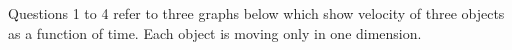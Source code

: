 \documentclass[10pt]{examdesign}
\begin{document}
	\begin{multiplechoice}[title={General Physics}, resetcounter=yes, examcolumns=2]
		\begin{block}
			Questions 1 to 4 refer to three graphs below which show velocity of three objects as a function of time. Each object is moving only in one dimension. 
			\begin{question}
					\choice 
			\end{question}
		\end{block}
	\end{multiplechoice} 
\end{document}

